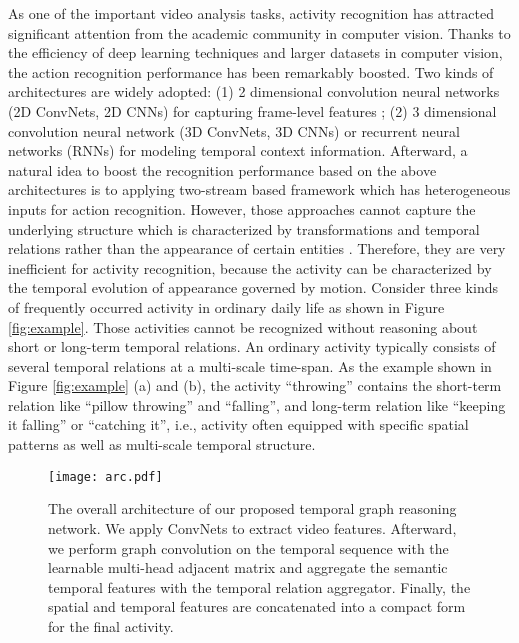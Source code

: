 \documentclass[conference,compsoc]{IEEEtran}
\begin{document}
    As one of the important video analysis tasks, activity recognition has attracted significant attention from the academic community in computer vision. Thanks to the efficiency of deep learning techniques and larger datasets in computer vision, the action recognition performance has been remarkably boosted. Two kinds of architectures are widely adopted: (1) 2 dimensional convolution neural networks (2D ConvNets, 2D CNNs) for capturing frame-level features \cite{wang2016temporal}; (2) 3 dimensional convolution neural network (3D ConvNets, 3D CNNs) \cite{carreira2017quo, qiu2017learning} or recurrent neural networks (RNNs) \cite{donahue2015long} for modeling temporal context information. Afterward, a natural idea to boost the recognition performance based on the above architectures is to applying two-stream \cite{simonyan2014two} based framework which has heterogeneous inputs for action recognition. However, those approaches cannot capture the underlying structure which is characterized by transformations and temporal relations rather than the appearance of certain entities \cite{zhou2018temporal}. Therefore, they are very inefficient for activity recognition, because the activity can be characterized by the temporal evolution of appearance governed by motion. Consider three kinds of frequently occurred activity in ordinary daily life as shown in Figure \ref{fig:example}. Those activities cannot be recognized without reasoning about short or long-term temporal relations. An ordinary activity typically consists of several temporal relations at a multi-scale time-span. As the example shown in Figure \ref{fig:example} (a) and (b), the activity ``throwing'' contains the short-term relation like ``pillow throwing'' and ``falling'', and long-term relation like ``keeping it falling'' or ``catching it'', i.e., activity often equipped with specific spatial patterns as well as multi-scale temporal structure.
    


    \begin{figure*}[h]
    \centering
    \texttt{[image: arc.pdf]}
    \caption{The overall architecture of our proposed temporal graph reasoning network. We apply ConvNets to extract video features. Afterward, we perform graph convolution on the temporal sequence with the learnable multi-head adjacent matrix and aggregate the semantic temporal features with the temporal relation aggregator. Finally, the spatial and temporal features are concatenated into a compact form for the final activity.}
    \label{fig:model}
    \end{figure*}
    
\end{document}
